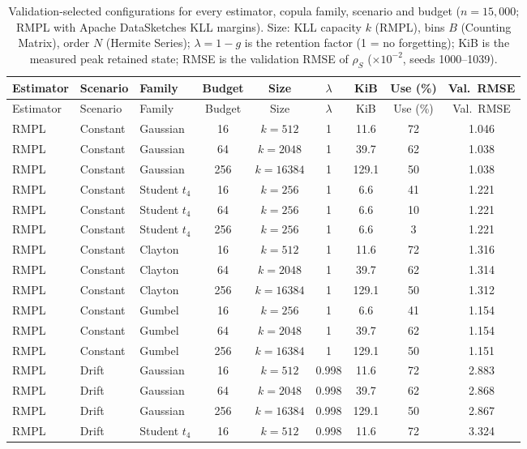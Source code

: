 \begin{longtable}{@{}lllcccccc@{}}
\caption{Validation-selected configurations for every estimator, copula family, scenario and budget ($n = 15{,}000$; RMPL with Apache DataSketches KLL margins). Size: KLL capacity $k$ (RMPL), bins $B$ (Counting Matrix), order $N$ (Hermite Series); $\lambda = 1 - g$ is the retention factor (1 = no forgetting); KiB is the measured peak retained state; RMSE is the validation RMSE of $\rho_S$ ($\times10^{-2}$, seeds 1000--1039).}\label{tab:ch6-budget-configs-full}\\
\toprule
Estimator & Scenario & Family & Budget & Size & $\lambda$ & KiB & Use (\%) & Val.\ RMSE \\
\midrule
\endfirsthead
\toprule
Estimator & Scenario & Family & Budget & Size & $\lambda$ & KiB & Use (\%) & Val.\ RMSE \\
\midrule
\endhead
\bottomrule
\endfoot
RMPL & Constant & Gaussian & 16 & $k=512$ & 1 & 11.6 & 72 & 1.046 \\
RMPL & Constant & Gaussian & 64 & $k=2048$ & 1 & 39.7 & 62 & 1.038 \\
RMPL & Constant & Gaussian & 256 & $k=16384$ & 1 & 129.1 & 50 & 1.038 \\
RMPL & Constant & Student $t_4$ & 16 & $k=256$ & 1 & 6.6 & 41 & 1.221 \\
RMPL & Constant & Student $t_4$ & 64 & $k=256$ & 1 & 6.6 & 10 & 1.221 \\
RMPL & Constant & Student $t_4$ & 256 & $k=256$ & 1 & 6.6 & 3 & 1.221 \\
RMPL & Constant & Clayton & 16 & $k=512$ & 1 & 11.6 & 72 & 1.316 \\
RMPL & Constant & Clayton & 64 & $k=2048$ & 1 & 39.7 & 62 & 1.314 \\
RMPL & Constant & Clayton & 256 & $k=16384$ & 1 & 129.1 & 50 & 1.312 \\
RMPL & Constant & Gumbel & 16 & $k=256$ & 1 & 6.6 & 41 & 1.154 \\
RMPL & Constant & Gumbel & 64 & $k=2048$ & 1 & 39.7 & 62 & 1.154 \\
RMPL & Constant & Gumbel & 256 & $k=16384$ & 1 & 129.1 & 50 & 1.151 \\
\addlinespace
RMPL & Drift & Gaussian & 16 & $k=512$ & 0.998 & 11.6 & 72 & 2.883 \\
RMPL & Drift & Gaussian & 64 & $k=2048$ & 0.998 & 39.7 & 62 & 2.868 \\
RMPL & Drift & Gaussian & 256 & $k=16384$ & 0.998 & 129.1 & 50 & 2.867 \\
RMPL & Drift & Student $t_4$ & 16 & $k=512$ & 0.998 & 11.6 & 72 & 3.324 \\

\end{longtable}
